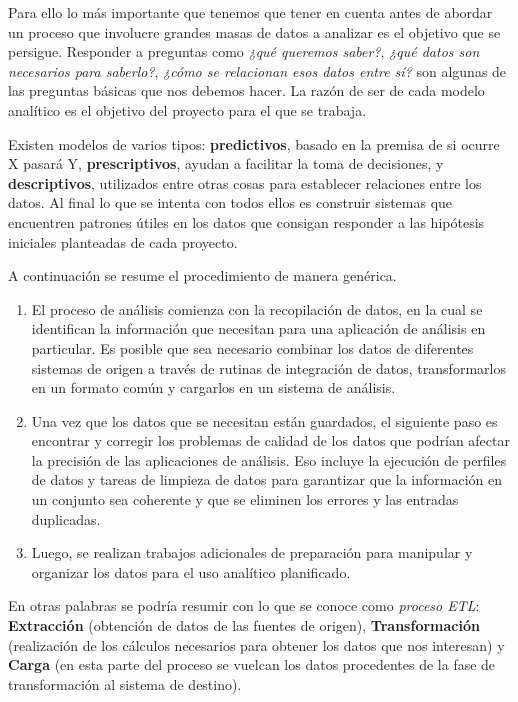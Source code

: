 Para ello lo más importante que tenemos que tener en cuenta antes de abordar un proceso que involucre grandes masas de datos a analizar es el objetivo que se persigue. Responder a preguntas como\textit{ ¿qué queremos saber?}, \textit{¿qué datos son necesarios para saberlo?}, \textit{¿cómo se relacionan esos datos entre sí?} son algunas de las preguntas básicas que nos debemos hacer. La razón de ser de cada modelo analítico es el objetivo del proyecto para el que se trabaja. 

Existen modelos de varios tipos: \textbf{predictivos}, basado en la premisa de si ocurre X pasará Y, \textbf{prescriptivos}, ayudan a facilitar la toma de decisiones, y \textbf{descriptivos}, utilizados entre otras cosas para establecer relaciones entre los datos. Al final lo que se intenta con todos ellos es construir sistemas que encuentren patrones útiles en los datos que consigan responder a las hipótesis iniciales planteadas de cada proyecto.

A continuación se resume el procedimiento de manera genérica. 
\begin{enumerate}
	\item El proceso de análisis comienza con la recopilación de datos, en la cual se identifican la información que necesitan para una aplicación de análisis en particular. Es posible que sea necesario combinar los datos de diferentes sistemas de origen a través de rutinas de integración de datos, transformarlos en un formato común y cargarlos en un sistema de análisis. 
	\item Una vez que los datos que se necesitan están guardados, el siguiente paso es encontrar y corregir los problemas de calidad de los datos que podrían afectar la precisión de las aplicaciones de análisis. Eso incluye la ejecución de perfiles de datos y tareas de limpieza de datos para garantizar que la información en un conjunto sea coherente y que se eliminen los errores y las entradas duplicadas.
	\item Luego, se realizan trabajos adicionales de preparación para manipular y organizar los datos para el uso analítico planificado.
\end{enumerate}

En otras palabras se podría resumir con lo que se conoce como \textit{proceso ETL}: \textbf{Extracción} (obtención de datos de las fuentes de origen), \textbf{Transformación} (realización de los cálculos necesarios para obtener los datos que nos interesan) y \textbf{Carga} (en esta parte del proceso se vuelcan los datos procedentes de la fase de transformación al sistema de destino).

